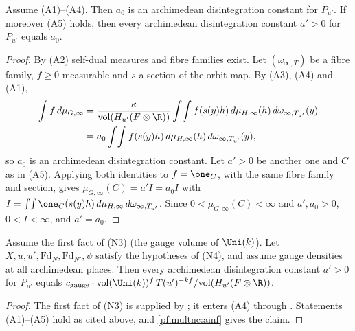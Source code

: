 \begin{lemma}\label{pf:multnc:ainf}
Assume (A1)--(A4). Then $a_0$ is an archimedean disintegration constant for $P_{u'}$. If moreover (A5) holds, then every
archimedean disintegration constant $a'>0$ for $P_{u'}$ equals $a_0$.
\end{lemma}

\begin{proof}
By (A2) self-dual measures and fibre families exist. Let $(\omega_{\infty,T})$ be a fibre family, $f\ge0$ measurable and $s$
a section of the orbit map. By (A3), (A4) and (A1),
\begin{align*}
\int f\,d\mu_{G,\infty}&=\frac{\kappa}{\mathrm{vol}(H_{u'}(F\otimes\R))}\int\!\int f(s(y)h)\,d\mu_{H,\infty}(h)\,
d\omega_{\infty,T_{u'}}(y)\\
&=a_0\int\!\int f(s(y)h)\,d\mu_{H,\infty}(h)\,d\omega_{\infty,T_{u'}}(y),
\end{align*}
so $a_0$ is an archimedean disintegration constant. Let $a'>0$ be another one and $C$ as in (A5). Applying both identities
to $f=\one_C$, with the same fibre family and section, gives $\mu_{G,\infty}(C)=a'I=a_0I$ with
$I=\int\!\int\one_C(s(y)h)\,d\mu_{H,\infty}\,d\omega_{\infty,T_{u'}}$. Since $0<\mu_{G,\infty}(C)<\infty$ and $a',a_0>0$,
$0<I<\infty$, and $a'=a_0$.
\end{proof}

\begin{theorem}\label{pf:multnc:aprime}
Assume the first fact of (N3) (the gauge volume of $\Uni(k)$). Let $X,u,u',\mathrm{Fd}_N,\mathrm{Fd}_{N'},\psi$ satisfy the
hypotheses of (N4), and assume gauge densities at all archimedean places. Then every archimedean disintegration constant
$a'>0$ for $P_{u'}$ equals $c_{\mathrm{gauge}}\cdot\mathrm{vol}(\Uni(k))^f\,T(u')^{-kf}/\mathrm{vol}(H_{u'}(F\otimes\R))$.
\end{theorem}

\begin{proof}
The first fact of (N3) is supplied by ; it enters (A4) through
. Statements (A1)--(A5) hold as cited above, and \cref{pf:multnc:ainf} gives the claim.
\end{proof}

